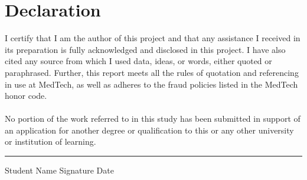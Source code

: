 
\section*{Declaration}

\vspace{1.4cm}
\large \noindent
I certify that I am the author of this project and that any assistance I received in its preparation is fully acknowledged and disclosed in this project. I have also cited any source from which I used data, ideas, or words, either quoted or paraphrased. Further, this report meets all the rules of quotation and referencing in use at MedTech, as well as adheres to the fraud policies listed in the MedTech honor code. \\
\\ No portion of the work referred to in this study has been submitted in support of an application for another degree or qualification to this or any other university or institution of learning.
\normalsize
\vspace{2cm}
\hrule
\vspace{0.2cm}
\noindent Student Name \hspace{7cm} Signature \hspace{3cm} Date